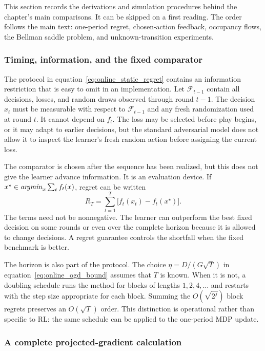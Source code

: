 This section records the derivations and simulation procedures behind the chapter's main comparisons. It can be skipped on a first reading. The order follows the main text: one-period regret, chosen-action feedback, occupancy flows, the Bellman saddle problem, and unknown-transition experiments.

\subsubsection{Timing, information, and the fixed comparator}

The protocol in equation~\eqref{eq:online_static_regret} contains an information restriction that is easy to omit in an implementation. Let $\mathcal F_{t-1}$ contain all decisions, losses, and random draws observed through round $t-1$. The decision $x_t$ must be measurable with respect to $\mathcal F_{t-1}$ and any fresh randomization used at round $t$. It cannot depend on $f_t$. The loss may be selected before play begins, or it may adapt to earlier decisions, but the standard adversarial model does not allow it to inspect the learner's fresh random action before assigning the current loss.

The comparator is chosen after the sequence has been realized, but this does not give the learner advance information. It is an evaluation device. If $x^\star\in\mathop{\it argmin}_x\sum_t f_t(x)$, regret can be written
\[
R_T=\sum_{t=1}^T\bigl[f_t(x_t)-f_t(x^\star)\bigr].
\]
The terms need not be nonnegative. The learner can outperform the best fixed decision on some rounds or even over the complete horizon because it is allowed to change decisions. A regret guarantee controls the shortfall when the fixed benchmark is better.

The horizon is also part of the protocol. The choice $\eta=D/(G\sqrt T)$ in equation~\eqref{eq:online_ogd_bound} assumes that $T$ is known. When it is not, a doubling schedule runs the method for blocks of lengths $1,2,4,\ldots$ and restarts with the step size appropriate for each block. Summing the $O(\sqrt{2^j})$ block regrets preserves an $O(\sqrt T)$ order. This distinction is operational rather than specific to RL: the same schedule can be applied to the one-period MDP update.

\subsubsection{A complete projected-gradient calculation}

